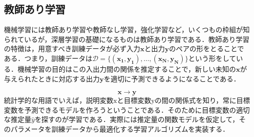 \documentclass[a4paper,11pt]{jsreport}
\begin{document}
\subsection{教師あり学習}
機械学習には教師あり学習や教師なし学習，強化学習など，いくつもの枠組が知られているが，深層学習の基礎になるものは教師あり学習である．教師あり学習の特徴は，用意すべき訓練データが必ず入力$\bm{x}$と出力$\bm{y}$のペアの形をとることである．つまり，訓練データは$\mathcal{D} = \{ (\bm{x_1}, \bm{y_1}), \dots, (\bm{x_N}, \bm{y_N}) \}$という形をしている．機械学習の目的はこの入出力間の関係を推定することで，新しい未知の$\bm{x}$が与えられたときに対応する出力$\bm{y}$を適切に予測できるようになることである．\par
\begin{equation}
  \bm{x} \longrightarrow \bm{y}
\end{equation}
統計学的な用語でいえば，説明変数$\mathrm{x}$と目標変数$\mathrm{y}$の間の関係式を知り，常に目標変数を予測できるモデルを作ろうということである．そのために目標変数の適切な推定量$\hat{y}$を探すのが学習である．実際には推定量の関数モデルを仮定して，そのパラメータを訓練データから最適化する学習アルゴリズムを実装する．
\end{document}
